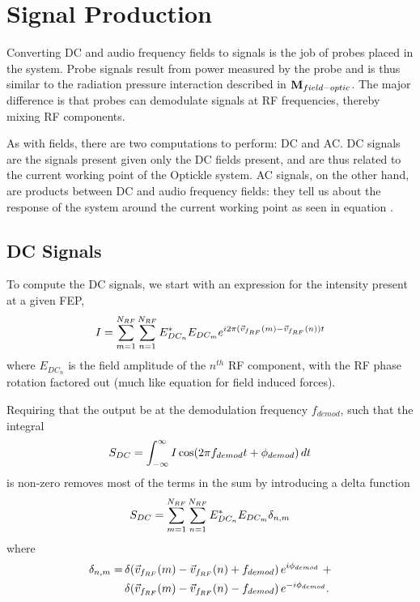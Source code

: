 \documentclass[12pt]{article}
\begin{document}
\section{Signal Production}
Converting DC and audio frequency fields to signals is the job of probes placed in the system.
Probe signals result from power measured by the probe and is thus similar to the radiation pressure interaction described in $\mathbf{M}_{field-optic}$.
The major difference is that probes can demodulate signals at RF frequencies, thereby mixing RF components.

As with fields, there are two computations to perform: DC and AC.
DC signals are the signals present given only the DC fields present, and are thus related to the current working point of the Optickle system.
AC signals, on the other hand, are products between DC and audio frequency fields: they tell us about the response of the system around the current working point as seen in equation .

\subsection{DC Signals}
To compute the DC signals, we start with an expression for the intensity present at a given FEP,
\begin{equation}
I = \sum^{\Nrf}_{m = 1} \sum^{\Nrf}_{n = 1}
 E^*_{DC_n} E_{DC_m} e^{i 2 \pi (\vFrf(m) - \vFrf(n)) t}
\elabel{intensity}
\end{equation}
where $E_{DC_n}$ is the field amplitude of the $n^{th}$ RF component, with the RF phase rotation factored out (much like equation  for field induced forces).

Requiring that the output be at the demodulation frequency $f_{demod}$, such that the integral
\begin{equation}
S_{DC} = \int^{\infty}_{-\infty} I \cos\!\left( {2 \pi f_{demod} t + \phi_{demod}} \right) dt
\end{equation}
is non-zero removes most of the terms in the sum by introducing a delta function
\begin{equation}
S_{DC} = \sum^{\Nrf}_{m = 1} \sum^{\Nrf}_{n = 1}
 E^*_{DC_n} E_{DC_m} \delta_{n,m}
\elabel{sigDC}
\end{equation}
where
\begin{align*}
\delta_{n,m} =
& \,{\delta}\!\left( {\vec{v}_{f_{RF}}(m) - \vec{v}_{f_{RF}}(n) + f_{demod}} \right) e^{ i \phi_{demod}} ~ + \\
& \,{\delta}\!\left( {\vec{v}_{f_{RF}}(m) - \vec{v}_{f_{RF}}(n) - f_{demod}} \right) e^{-i \phi_{demod}}.
\end{align*}
\end{document}
